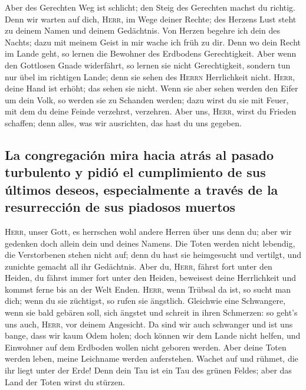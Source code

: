  Aber des Gerechten Weg ist schlicht; den Steig des
Gerechten machst du richtig.  Denn wir warten auf dich,
\textsc{Herr}, im Wege deiner Rechte; des Herzens Lust steht zu deinem
Namen und deinem Gedächtnis.  Von Herzen begehre ich dein
des Nachts; dazu mit meinem Geist in mir wache ich früh zu dir. Denn wo
dein Recht im Lande geht, so lernen die Bewohner des Erdbodens
Gerechtigkeit.  Aber wenn den Gottlosen Gnade widerfährt,
so lernen sie nicht Gerechtigkeit, sondern tun nur übel im richtigen
Lande; denn sie sehen des \textsc{Herrn} Herrlichkeit nicht.
 \textsc{Herr}, deine Hand ist erhöht; das sehen sie
nicht. Wenn sie aber sehen werden den Eifer um dein Volk, so werden sie
zu Schanden werden; dazu wirst du sie mit Feuer, mit dem du deine Feinde
verzehrst, verzehren.  Aber uns, \textsc{Herr}, wirst du
Frieden schaffen; denn alles, was wir ausrichten, das hast du uns
gegeben.

\hypertarget{la-congregaciuxf3n-mira-hacia-atruxe1s-al-pasado-turbulento-y-pidiuxf3-el-cumplimiento-de-sus-uxfaltimos-deseos-especialmente-a-travuxe9s-de-la-resurrecciuxf3n-de-sus-piadosos-muertos}{%
\subsection{La congregación mira hacia atrás al pasado turbulento y
pidió el cumplimiento de sus últimos deseos, especialmente a través de
la resurrección de sus piadosos
muertos}\label{la-congregaciuxf3n-mira-hacia-atruxe1s-al-pasado-turbulento-y-pidiuxf3-el-cumplimiento-de-sus-uxfaltimos-deseos-especialmente-a-travuxe9s-de-la-resurrecciuxf3n-de-sus-piadosos-muertos}}

 \textsc{Herr}, unser Gott, es herrschen wohl andere
Herren über uns denn du; aber wir gedenken doch allein dein und deines
Namens.  Die Toten werden nicht lebendig, die
Verstorbenen stehen nicht auf; denn du hast sie heimgesucht und
vertilgt, und zunichte gemacht all ihr Gedächtnis.  Aber
du, \textsc{Herr}, fährst fort unter den Heiden, du fährst immer fort
unter den Heiden, beweisest deine Herrlichkeit und kommst ferne bis an
der Welt Enden.  \textsc{Herr}, wenn Trübsal da ist, so
sucht man dich; wenn du sie züchtigst, so rufen sie ängstlich.
 Gleichwie eine Schwangere, wenn sie bald gebären soll,
sich ängstet und schreit in ihren Schmerzen: so geht's uns auch,
\textsc{Herr}, vor deinem Angesicht.  Da sind wir auch
schwanger und ist uns bange, dass wir kaum Odem holen; doch können wir
dem Lande nicht helfen, und Einwohner auf dem Erdboden wollen nicht
geboren werden.  Aber deine Toten werden leben, meine
Leichname werden auferstehen. Wachet auf und rühmet, die ihr liegt unter
der Erde! Denn dein Tau ist ein Tau des grünen Feldes; aber das Land der
Toten wirst du stürzen.

